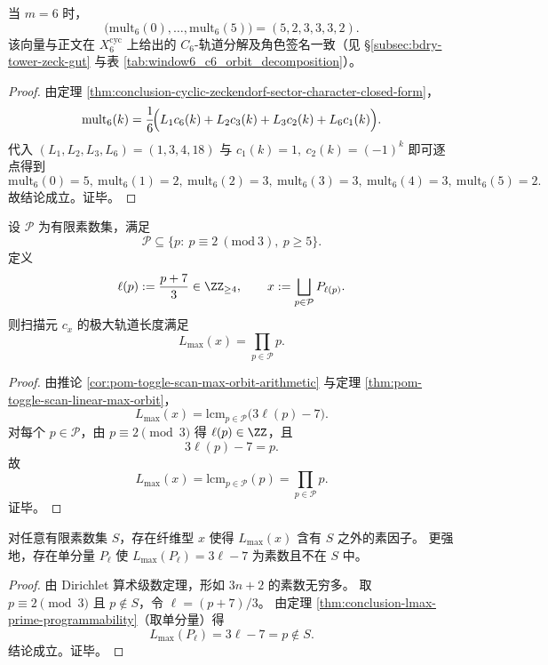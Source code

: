 \begin{corollary}\label{cor:conclusion-window6-fourier-signature-lucas-ramanujan}
当 \(m=6\) 时，
\[
\bigl(\mathrm{mult}_6(0),\dots,\mathrm{mult}_6(5)\bigr)=(5,2,3,3,3,2).
\]
该向量与正文在 \(X_6^{\mathrm{cyc}}\) 上给出的 \(C_6\)-轨道分解及角色签名一致（见 \S\ref{subsec:bdry-tower-zeck-gut} 与表 \ref{tab:window6_c6_orbit_decomposition}）。
\end{corollary}
\begin{proof}
由定理 \ref{thm:conclusion-cyclic-zeckendorf-sector-character-closed-form}，
\[
\mathrm{mult}_6(k)=\frac16\!\Bigl(L_1c_6(k)+L_2c_3(k)+L_3c_2(k)+L_6c_1(k)\Bigr).
\]
代入
\(
(L_1,L_2,L_3,L_6)=(1,3,4,18)
\)
与
\(
c_1(k)=1,\ c_2(k)=(-1)^k
\)
即可逐点得到
\[
\mathrm{mult}_6(0)=5,\ \mathrm{mult}_6(1)=2,\ \mathrm{mult}_6(2)=3,\ \mathrm{mult}_6(3)=3,\ \mathrm{mult}_6(4)=3,\ \mathrm{mult}_6(5)=2.
\]
故结论成立。证毕。
\end{proof}

\begin{theorem}[极大扫描轨道长度对素数集的算术可编程性]\label{thm:conclusion-lmax-prime-programmability}
设 \(\mathcal P\) 为有限素数集，满足
\[
\mathcal P\subseteq\{p:\ p\equiv 2\ (\mathrm{mod}\ 3),\ p\ge 5\}.
\]
定义
\[
\ell(p):=\frac{p+7}{3}\in\ZZ_{\ge 4},
\qquad
x:=\bigsqcup_{p\in\mathcal P}P_{\ell(p)}.
\]
则扫描元 \(c_x\) 的极大轨道长度满足
\[
L_{\max}(x)=\prod_{p\in\mathcal P}p.
\]
\end{theorem}
\begin{proof}
由推论 \ref{cor:pom-toggle-scan-max-orbit-arithmetic} 与定理 \ref{thm:pom-toggle-scan-linear-max-orbit}，
\[
L_{\max}(x)=\mathrm{lcm}_{p\in\mathcal P}\!\bigl(3\ell(p)-7\bigr).
\]
对每个 \(p\in\mathcal P\)，由 \(p\equiv 2\pmod 3\) 得 \(\ell(p)\in\ZZ\)，且
\[
3\ell(p)-7=p.
\]
故
\[
L_{\max}(x)=\mathrm{lcm}_{p\in\mathcal P}(p)=\prod_{p\in\mathcal P}p.
\]
证毕。
\end{proof}

\begin{corollary}[极大时间谱不可有限素数化]\label{cor:conclusion-lmax-not-finite-primeizable}
对任意有限素数集 \(S\)，存在纤维型 \(x\) 使得 \(L_{\max}(x)\) 含有 \(S\) 之外的素因子。
更强地，存在单分量 \(P_\ell\) 使 \(L_{\max}(P_\ell)=3\ell-7\) 为素数且不在 \(S\) 中。
\end{corollary}
\begin{proof}
由 Dirichlet 算术级数定理，形如 \(3n+2\) 的素数无穷多。
取 \(p\equiv 2\pmod 3\) 且 \(p\notin S\)，令 \(\ell=(p+7)/3\)。
由定理 \ref{thm:conclusion-lmax-prime-programmability}（取单分量）得
\[
L_{\max}(P_\ell)=3\ell-7=p\notin S.
\]
结论成立。证毕。
\end{proof}

